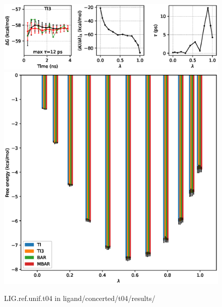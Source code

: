 \documentclass[journal=jctcce,manuscript=article,hyperref=false]{achemso}
\begin{document}
\clearpage
\pagebreak
\begin{figure}
\includegraphics[clip,width=6in]{ligand.concerted.t04.results..GvsT.eps}\vspace{-0.3cm}
\includegraphics[clip,width=6in]{ligand.concerted.t04.results..GvsL.eps}\vspace{-0.3cm}
\caption{LIG.ref.unif.t04 in ligand/concerted/t04/results/}
\end{figure}
\end{document}
